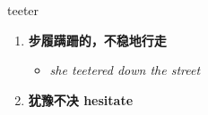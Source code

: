 
\begin{frame}
{\huge teeter}
\begin{center}
\begin{enumerate}\Large
  \item \textbf{步履蹒跚的，不稳地行走}
  \begin{itemize}
    \item \em{\Large{she teetered down the street}}
  \end{itemize}
  \item \textbf{犹豫不决 hesitate}
\end{enumerate}
\end{center}
\end{frame}
